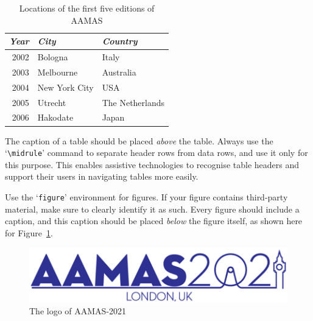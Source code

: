 \documentclass[sigconf,anonymous]{aamas}
\begin{document}
\begin{table}[t]
  \caption{Locations of the first five editions of AAMAS}
  \label{tab:locations}
  \begin{tabular}{rll}\toprule
    \textit{Year} & \textit{City} & \textit{Country} \\ \midrule
    2002 & Bologna & Italy \\
    2003 & Melbourne & Australia \\
    2004 & New York City & USA \\
    2005 & Utrecht & The Netherlands \\
    2006 & Hakodate & Japan \\ \bottomrule
  \end{tabular}
\end{table}

The caption of a table should be placed \emph{above} the table. 
Always use the `\verb|\midrule|' command to separate header rows from 
data rows, and use it only for this purpose. This enables assistive 
technologies to recognise table headers and support their users in 
navigating tables more easily.

\balance

Use the `\texttt{figure}' environment for figures. If your figure 
contains third-party material, make sure to clearly identify it as such.
Every figure should include a caption, and this caption should be placed 
\emph{below} the figure itself, as shown here for Figure~\ref{fig:logo}.

\begin{figure}[h]
  \centering
  \includegraphics[width=\linewidth]{aamas21logo}
  \caption{The logo of AAMAS-2021}
  \label{fig:logo}
\end{figure}
\end{document}
